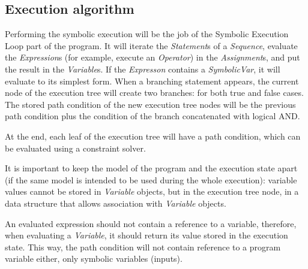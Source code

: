 \subsection{Execution algorithm}

Performing the symbolic execution will be the job of the Symbolic Execution Loop part of the program. It will iterate the \textit{Statement}s of a \textit{Sequence}, evaluate the \textit{Expression}s (for example, execute an \textit{Operator}) in the \textit{Assignment}s, and put the result in the \textit{Variable}s. If the \textit{Expresson} contains a \textit{SymbolicVar}, it will evaluate to its simplest form. When a branching statement appears, the current node of the execution tree will create two branches: for both true and false cases. The stored path condition of the new execution tree nodes will be the previous path condition plus the condition of the branch concatenated with logical AND.

At the end, each leaf of the execution tree will have a path condition, which can be evaluated using a constraint solver.

It is important to keep the model of the program and the execution state apart (if the same model is intended to be used during the whole execution): variable values cannot be stored in \textit{Variable} objects, but in the execution tree node, in a data structure that allows association with \textit{Variable} objects. 

An evaluated expression should not contain a reference to a variable, therefore, when evaluating a \textit{Variable}, it should return its value stored in the execution state. This way, the path condition will not contain reference to a program variable either, only symbolic variables (inputs).
